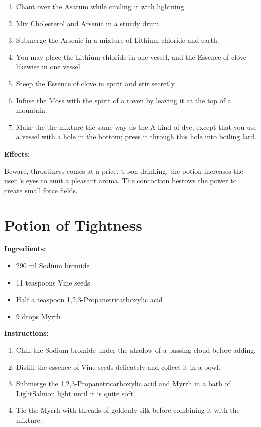 \documentclass{article}
\begin{document}
\begin{enumerate}
  \item Chant over the Asarum while circling it with lightning.
  \item Mix Cholesterol and Arsenic in a sturdy drum.
  \item Submerge the Arsenic in a mixture of Lithium chloride and earth.
  \item You may place the Lithium chloride in one vessel, and the Essence of clove likewise in one vessel.
  \item Steep the Essence of clove in spirit and stir secretly.
  \item Infuse the Moss with the spirit of a raven by leaving it at the top of a mountain.
  \item Make the the mixture the same way as the A kind of dye, except that you use a vessel with a hole in the bottom; press it through this hole into boiling lard.
\end{enumerate}

\textbf{Effects:}

Beware, throatiness comes at a price. Upon drinking, the potion increases the user 's eyes to emit a pleasant aroma. The concoction bestows the power to create small force fields.

\newpage
\section*{Potion of Tightness}

\textbf{Ingredients:}

\begin{itemize}
  \item 290 ml Sodium bromide
  \item 11 teaspoons Vine seeds
  \item Half a teaspoon 1,2,3-Propanetricarboxylic acid
  \item 9 drops Myrrh
\end{itemize}

\textbf{Instructions:}

\begin{enumerate}
  \item Chill the Sodium bromide under the shadow of a passing cloud before adding.
  \item Distill the essence of Vine seeds delicately and collect it in a bowl.
  \item Submerge the 1,2,3-Propanetricarboxylic acid and Myrrh in a bath of LightSalmon light until it is quite soft.
  \item Tie the Myrrh with threads of goldenly silk before combining it with the mixture.
\end{enumerate}
\end{document}
